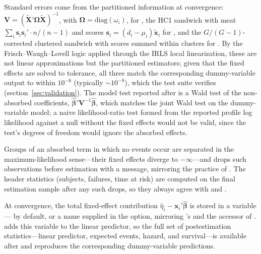 \documentclass[12pt,a4paper]{article}
\begin{document}
\begin{sloppypar}
Standard errors come from the partitioned information at convergence:
$\mathbf{V} = (\tilde{\mathbf{X}}'\bm{\Omega}\tilde{\mathbf{X}})^{-1}$,
with $\bm{\Omega} = \mathrm{diag}(\omega_i)$, for
, the HC1 sandwich with meat
$\sum_i \mathbf{s}_i \mathbf{s}_i' \cdot n/(n-1)$ and scores
$\mathbf{s}_i = (d_i - \mu_i)\tilde{\mathbf{x}}_i$ for
, and
the $G/(G-1)$-corrected clustered sandwich with scores summed within
clusters for .  By the
Frisch--Waugh--Lovell logic applied through the IRLS local linearization, these are not linear approximations but the
partitioned estimators; given that the fixed effects are solved to
tolerance, all three match the corresponding dummy-variable
 output to within $10^{-6}$ (typically $\sim 10^{-8}$),
which the test suite verifies (section~\ref{sec:validation}).  The model test reported after
 is a Wald test of the non-absorbed coefficients,
$\hat{\bm{\beta}}'\mathbf{V}^{-1}\hat{\bm{\beta}}$, which matches the
joint Wald test on the dummy-variable model; a naive likelihood-ratio
test formed from the reported profile log likelihood against a null
without the fixed effects would not be valid, since the test's degrees of
freedom would ignore the absorbed effects.
\end{sloppypar}

Groups of an absorbed term in which no events occur are separated in the
maximum-likelihood sense---their fixed effects diverge to
\(-\infty\)---and  drops such observations before
estimation with a message, mirroring the practice of 
\citep[which treats separation in far greater generality]{correia2020}.
The header statistics (subjects, failures, time at risk) are computed on
the final estimation sample after any such drops, so they always agree
with  and .

\begin{sloppypar}
At convergence, the total fixed-effect contribution
$\hat{\eta}_i - \mathbf{x}_i'\hat{\bm{\beta}}$ is stored in a
variable--- by default, or a name supplied in the
 option, mirroring 's  and the
 accessor of .   adds this
variable to the linear predictor, so the full set of postestimation
statistics---linear predictor, expected events, hazard, and
survival---is available after  and reproduces the
corresponding dummy-variable  predictions.
\end{sloppypar}
\end{document}
